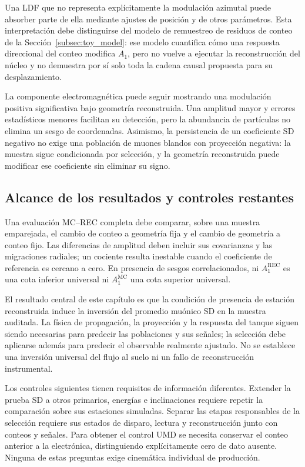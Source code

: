 Una LDF que no representa explícitamente la modulación azimutal puede absorber parte de ella mediante ajustes de posición y de otros parámetros. Esta interpretación debe distinguirse del modelo de remuestreo de residuos de conteo de la Sección~\ref{subsec:toy_model}: ese modelo cuantifica cómo una respuesta direccional del conteo modifica $A_1$, pero no vuelve a ejecutar la reconstrucción del núcleo y no demuestra por sí solo toda la cadena causal propuesta para su desplazamiento.

La componente electromagnética puede seguir mostrando una modulación positiva significativa bajo geometría reconstruida. Una amplitud mayor y errores estadísticos menores facilitan su detección, pero la abundancia de partículas no elimina un sesgo de coordenadas. Asimismo, la persistencia de un coeficiente SD negativo no exige una población de muones blandos con proyección negativa: la muestra sigue condicionada por selección, y la geometría reconstruida puede modificar ese coeficiente sin eliminar su signo.

\subsection{Alcance de los resultados y controles restantes}
\label{subsec:comparacion_performance_umd}
\label{subsec:fast_mc}

Una evaluación MC--REC completa debe comparar, sobre una muestra emparejada, el cambio de conteo a geometría fija y el cambio de geometría a conteo fijo. Las diferencias de amplitud deben incluir sus covarianzas y las migraciones radiales; un cociente resulta inestable cuando el coeficiente de referencia es cercano a cero. En presencia de sesgos correlacionados, ni $A_1^{\mathrm{REC}}$ es una cota inferior universal ni $A_1^{\mathrm{MC}}$ una cota superior universal.

El resultado central de este capítulo es que la condición de presencia de estación reconstruida induce la inversión del promedio muónico SD en la muestra auditada. La física de propagación, la proyección y la respuesta del tanque siguen siendo necesarias para predecir las poblaciones y sus señales; la selección debe aplicarse además para predecir el observable realmente ajustado. No se establece una inversión universal del flujo al suelo ni un fallo de reconstrucción instrumental.

Los controles siguientes tienen requisitos de información diferentes. Extender la prueba SD a otros primarios, energías e inclinaciones requiere repetir la comparación sobre sus estaciones simuladas. Separar las etapas responsables de la selección requiere sus estados de disparo, lectura y reconstrucción junto con conteos y señales. Para obtener el control UMD se necesita conservar el conteo anterior a la electrónica, distinguiendo explícitamente cero de dato ausente. Ninguna de estas preguntas exige cinemática individual de producción.

